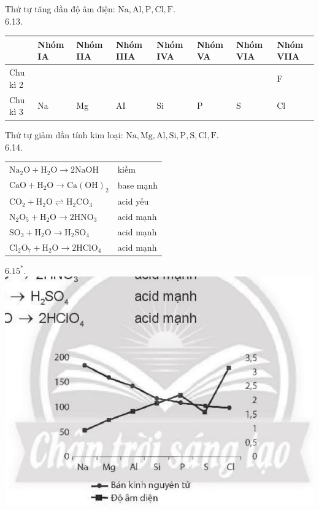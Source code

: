 \documentclass[10pt]{article}
\begin{document}
Thứ tự tăng dần độ âm điện: $\mathrm{Na}, \mathrm{Al}, \mathrm{P}, \mathrm{Cl}, \mathrm{F}$.\\
6.13.

\begin{center}
\begin{tabular}{|l|l|l|l|l|l|l|l|}
\hline
 & Nhóm IA & Nhóm IIA & Nhóm IIIA & Nhóm IVA & Nhóm VA & Nhóm VIA & Nhóm VIIA \\
\hline
Chu kì 2 &  &  &  &  &  &  & F \\
\hline
Chu kì 3 & Na & Mg & AI & Si & P & S & Cl \\
\hline
\end{tabular}
\end{center}

Thứ tự giảm dần tính kim loại: $\mathrm{Na}, \mathrm{Mg}, \mathrm{Al}, \mathrm{Si}, \mathrm{P}, \mathrm{S}, \mathrm{Cl}, \mathrm{F}$.\\
6.14.

\begin{center}
\begin{tabular}{ll}
$\mathrm{Na}_{2} \mathrm{O}+\mathrm{H}_{2} \mathrm{O} \rightarrow 2 \mathrm{NaOH}$ & kiềm \\
$\mathrm{CaO}+\mathrm{H}_{2} \mathrm{O} \rightarrow \mathrm{Ca}(\mathrm{OH})_{2}$ & base mạnh \\
$\mathrm{CO}_{2}+\mathrm{H}_{2} \mathrm{O} \rightleftharpoons \mathrm{H}_{2} \mathrm{CO}_{3}$ & acid yếu \\
$\mathrm{N}_{2} \mathrm{O}_{5}+\mathrm{H}_{2} \mathrm{O} \rightarrow 2 \mathrm{HNO}_{3}$ & acid mạnh \\
$\mathrm{SO}_{3}+\mathrm{H}_{2} \mathrm{O} \rightarrow \mathrm{H}_{2} \mathrm{SO}_{4}$ & acid mạnh \\
$\mathrm{Cl}_{2} \mathrm{O}_{7}+\mathrm{H}_{2} \mathrm{O} \rightarrow 2 \mathrm{HClO}_{4}$ & acid mạnh \\
\end{tabular}
\end{center}

$6.15^{*}$.\\
\includegraphics[max width=\textwidth, center]{2025_10_23_57761e23b8c46a11c3efg-15}
\end{document}
